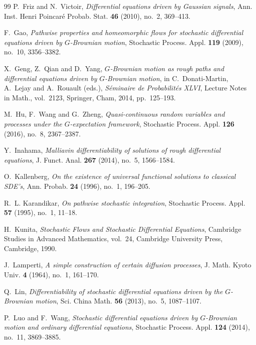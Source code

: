 \documentclass[11pt,reqno]{amsart}
\theoremstyle{plain}
\theoremstyle{definition}
\begin{document}
{\begin{thebibliography}{99}
P.~Friz and N.~Victoir,
\emph{Differential equations driven by Gaussian signals},
Ann. Inst. Henri Poincar\'e Probab. Stat. \textbf{46} (2010), no.~2,
369--413.

F.~Gao,
\emph{Pathwise properties and homeomorphic flows for stochastic differential
equations driven by \(G\)-Brownian motion},
Stochastic Process. Appl. \textbf{119} (2009), no.~10, 3356--3382.

X.~Geng, Z.~Qian and D.~Yang,
\emph{\(G\)-Brownian motion as rough paths and differential equations
driven by \(G\)-Brownian motion},
in C.~Donati-Martin, A.~Lejay and A.~Rouault (eds.),
\emph{S\'eminaire de Probabilit\'es XLVI},
Lecture Notes in Math., vol.~2123,
Springer, Cham, 2014, pp.~125--193.

M.~Hu, F.~Wang and G.~Zheng,
\emph{Quasi-continuous random variables and processes under the
\(G\)-expectation framework},
Stochastic Process. Appl. \textbf{126} (2016), no.~8, 2367--2387.

Y.~Inahama,
\emph{Malliavin differentiability of solutions of rough differential
equations},
J. Funct. Anal. \textbf{267} (2014), no.~5, 1566--1584.

O.~Kallenberg,
\emph{On the existence of universal functional solutions to classical SDE's},
Ann. Probab. \textbf{24} (1996), no.~1, 196--205.

R.~L. Karandikar,
\emph{On pathwise stochastic integration},
Stochastic Process. Appl. \textbf{57} (1995), no.~1, 11--18.

H.~Kunita,
\emph{Stochastic Flows and Stochastic Differential Equations},
Cambridge Studies in Advanced Mathematics, vol.~24,
Cambridge University Press, Cambridge, 1990.

J.~Lamperti,
\emph{A simple construction of certain diffusion processes},
J. Math. Kyoto Univ. \textbf{4} (1964), no.~1, 161--170.

Q.~Lin,
\emph{Differentiability of stochastic differential equations driven by the
\(G\)-Brownian motion},
Sci. China Math. \textbf{56} (2013), no.~5, 1087--1107.

P.~Luo and F.~Wang,
\emph{Stochastic differential equations driven by \(G\)-Brownian motion and
ordinary differential equations},
Stochastic Process. Appl. \textbf{124} (2014), no.~11, 3869--3885.


\end{thebibliography}}
\end{document}
